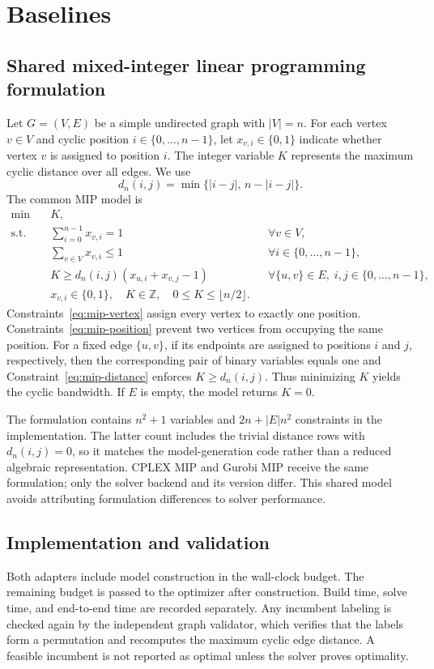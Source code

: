\section{Baselines}

\subsection{Shared mixed-integer linear programming formulation}
Let $G=(V,E)$ be a simple undirected graph with $|V|=n$. For each vertex
$v\in V$ and cyclic position $i\in\{0,\ldots,n-1\}$, let
$x_{v,i}\in\{0,1\}$ indicate whether vertex $v$ is assigned to position $i$.
The integer variable $K$ represents the maximum cyclic distance over all edges.
We use
\[
 d_n(i,j)=\min\{|i-j|,\,n-|i-j|\}.
\]
The common MIP model is
\begin{align}
 \min\quad & K, \label{eq:mip-objective}\\
 \text{s.t.}\quad
 &\sum_{i=0}^{n-1}x_{v,i}=1
 &&\forall v\in V, \label{eq:mip-vertex}\\
 &\sum_{v\in V}x_{v,i}\leq 1
 &&\forall i\in\{0,\ldots,n-1\}, \label{eq:mip-position}\\
 &K\geq d_n(i,j)(x_{u,i}+x_{v,j}-1)
 &&\forall\{u,v\}\in E,\; i,j\in\{0,\ldots,n-1\}, \label{eq:mip-distance}\\
 &x_{v,i}\in\{0,1\},\quad K\in\mathbb{Z},\quad
 0\leq K\leq\lfloor n/2\rfloor. \label{eq:mip-domain}
\end{align}
Constraints~\eqref{eq:mip-vertex} assign every vertex to exactly one position.
Constraints~\eqref{eq:mip-position} prevent two vertices from occupying the
same position. For a fixed edge $\{u,v\}$, if its endpoints are assigned to
positions $i$ and $j$, respectively, then the corresponding pair of binary
variables equals one and Constraint~\eqref{eq:mip-distance} enforces
$K\geq d_n(i,j)$. Thus minimizing $K$ yields the cyclic bandwidth. If $E$ is
empty, the model returns $K=0$.

The formulation contains $n^2+1$ variables and
$2n+|E|n^2$ constraints in the implementation. The latter count includes the
trivial distance rows with $d_n(i,j)=0$, so it matches the model-generation
code rather than a reduced algebraic representation. CPLEX MIP and Gurobi MIP
receive the same formulation; only the solver backend and its version differ.
This shared model avoids attributing formulation differences to solver
performance.

\subsection{Implementation and validation}
Both adapters include model construction in the wall-clock budget. The remaining
budget is passed to the optimizer after construction. Build time, solve time,
and end-to-end time are recorded separately. Any incumbent labeling is checked
again by the independent graph validator, which verifies that the labels form a
permutation and recomputes the maximum cyclic edge distance. A feasible
incumbent is not reported as optimal unless the solver proves optimality.

